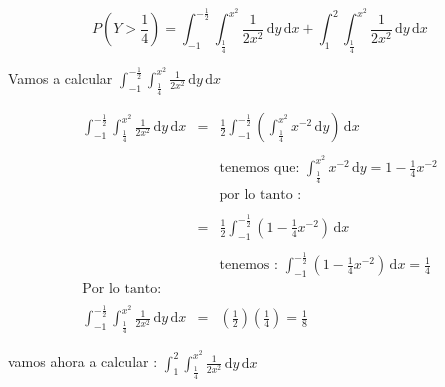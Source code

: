 \documentclass[12pt]{article}
\begin{document}
    \begin{equation*}
        P\left(Y>\frac{1}{4}\right) = \displaystyle \int_{-1}^{- \frac{1}{2}} \int_{\frac{1}{4}}^{x^2} \frac{1}{2x^2} \,\mathrm{d}y  \,\mathrm{d}x  + \int_{1}^{2} \int_{\frac{1}{4}}^{x^2} \frac{1}{2x^2} \,\mathrm{d}y  \,\mathrm{d}x 
    \end{equation*}

    \begin{flushleft}
        Vamos a calcular $\displaystyle \int_{-1}^{- \frac{1}{2}} \int_{\frac{1}{4}}^{x^2} \frac{1}{2x^2} \,\mathrm{d}y  \,\mathrm{d}x $
    \end{flushleft}

    \begin{equation*}
        \begin{array}{rcl}
            \displaystyle \int_{-1}^{- \frac{1}{2}} \int_{\frac{1}{4}}^{x^2} \frac{1}{2x^2} \,\mathrm{d}y  \,\mathrm{d}x  & = & \displaystyle  \frac{1}{2} \int_{-1}^{- \frac{1}{2}} \left(\int_{\frac{1}{4}}^{x^2}x^{-2}\,\mathrm{d}y \right) \,\mathrm{d}x 
            \\
            \\
            && \mbox{tenemos que: $\displaystyle \int_{\frac{1}{4}}^{x^2}x^{-2}\,\mathrm{d}y  = 1 - \frac{1}{4} x^{-2}$} 
            \\
            && \mbox{por lo tanto : }
            \\
            \\
            & = & \displaystyle  \frac{1}{2} \int_{-1}^{- \frac{1}{2}} \left(1 - \frac{1}{4} x^{-2}\right) \,\mathrm{d}x 
            \\
            \\
            && \mbox{tenemos : $\displaystyle  \int_{-1}^{- \frac{1}{2}} \left(1 - \frac{1}{4} x^{-2}\right) \,\mathrm{d}x = \frac{1}{4} $}
            \\
            \mbox{Por lo tanto: }
            \\
            \\
            \displaystyle \int_{-1}^{- \frac{1}{2}} \int_{\frac{1}{4}}^{x^2} \frac{1}{2x^2} \,\mathrm{d}y  \,\mathrm{d}x & = & \displaystyle \left(\frac{1}{2} \right) \left(\frac{1}{4}\right) = \frac{1}{8}
        \end{array}
    \end{equation*}

    \begin{flushleft}
        vamos ahora a calcular : $\displaystyle \int_{1}^{2} \int_{\frac{1}{4}}^{x^2} \frac{1}{2x^2} \,\mathrm{d}y  \,\mathrm{d}x$
    \end{flushleft}
\end{document}
